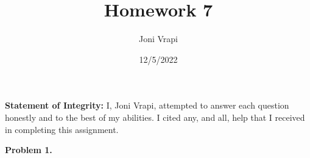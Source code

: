 \documentclass{article}
\title{Homework 7}
\author{Joni Vrapi}
\date{12/5/2022}
\begin{document}
\maketitle

\textbf{Statement of Integrity:} I, Joni Vrapi, attempted to answer each question honestly and to the best of my abilities. I cited any, and all, help that I received in completing this assignment.

\hfill

\textbf{Problem 1.} 

\newpage
 

\end{document}
